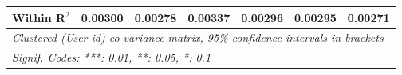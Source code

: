 \begin{table}[htbp]
\begin{threeparttable}[b]
\begin{tabular}{lcccccc}
         Within R$^2$                    & 0.00300         & 0.00278         & 0.00337         & 0.00296         & 0.00295         & 0.00271\\  
         \midrule \midrule
         \multicolumn{7}{l}{\emph{Clustered (User id) co-variance matrix, 95\% confidence intervals in brackets}}\\
         \multicolumn{7}{l}{\emph{Signif. Codes: ***: 0.01, **: 0.05, *: 0.1}}\\
      \end{tabular}
   \end{threeparttable}
\end{table}


